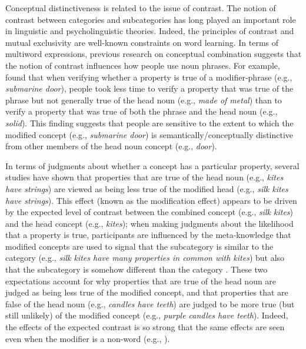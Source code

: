 \documentclass[output=paper]{langsci/langscibook}
\begin{document}
Conceptual distinctiveness is related to the issue of contrast. The
notion of contrast between categories and subcategories has long
played an important role in linguistic and psycholinguistic
theories. Indeed, the principles of contrast and mutual exclusivity \citep{clark1983lexicon,carstairs2010evolution} are well-known constraints on
word learning. In terms of multiword expressions, previous research on
conceptual combination suggests that the notion of contrast influences
how people use noun phrases. For example, \citet{gagne1996influence}
found that when verifying whether a property is true of a
modifier-phrase (e.g., \textit{submarine door}), people took less time
to verify a property that was true of the phrase but not generally
true of the head noun (e.g., \textit{made of metal}) than to verify a
property that was true of both the phrase and the head noun (e.g.,
\textit{solid}). This finding suggests that people are sensitive to
the extent to which the modified concept (e.g., \textit{submarine
  door}) is semantically/conceptually distinctive from other members
of the head noun concept (e.g., \textit{door}).

In terms of judgments about whether a concept has a particular
property, several studies \citep{connolly2007stereotypes,gagne2011inferential,gagne2014subcategorisation,hampton2011modifier,jonsson2012modifier} have shown that properties that are true of
the head noun (e.g., \textit{kites have strings}) are viewed as being
less true of the modified head (e.g., \textit{silk kites have
  strings}). This effect (known as the modification effect) appears to
be driven by the expected level of contrast between the combined
concept (e.g., \textit{silk kites}) and the head concept (e.g.,
\textit{kites}); when making judgments about the likelihood that a
property is true, participants are influenced by the meta-knowledge
that modified concepts are used to signal that the subcategory is
similar to the category (e.g., \textit{silk kites have many properties in
common with kites}) but also that the subcategory is somehow different
than the category \citep{gagne2011inferential,gagne2014subcategorisation,spalding2015property}. These two expectations account for why
properties that are true of the head noun are judged as being less
true of the modified concept, and that properties that are false of
the head noun (e.g., \textit{candles have teeth}) are judged to be
more true (but still unlikely) of the modified concept (e.g.,
\textit{purple candles have teeth}). Indeed, the effects of the
expected contrast is so strong that the same effects are seen even
when the modifier is a non-word (e.g., \citealt{gagne2015semantics}).
\end{document}
